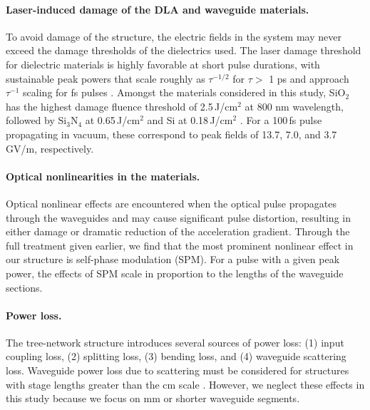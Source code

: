 \paragraph{Laser-induced damage of the DLA and waveguide materials.} To avoid damage of the structure, the electric fields in the system may never exceed the damage thresholds of the dielectrics used.  The laser damage threshold for dielectric materials is highly favorable at short pulse durations, with sustainable peak powers that scale roughly as $\tau^{-1/2}$ for $\tau >$ 1 ps and approach $\tau^{-1}$ scaling for fs pulses \cite{stuart1995laser, stuart1996nanosecond}.  Amongst the materials considered in this study, SiO$_2$ has the highest damage fluence threshold of 2.5\,J/cm$^{2}$ at 800 nm wavelength, followed by Si$_3$N$_4$ at 0.65\,J/cm$^{2}$ and Si at 0.18\,J/cm$^{2}$ \cite{soong2012laser}. For a 100\,fs pulse propagating in vacuum, these correspond to peak fields of 13.7, 7.0, and 3.7\,GV/m, respectively.

\paragraph{Optical nonlinearities in the materials.} Optical nonlinear effects are encountered when the optical pulse propagates through the waveguides and may cause significant pulse distortion, resulting in either damage or dramatic reduction of the acceleration gradient. Through the full treatment given earlier, we find that the most prominent nonlinear effect in our structure is self-phase modulation (SPM).  For a pulse with a given peak power, the effects of SPM scale in proportion to the lengths of the waveguide sections.
 
\paragraph{Power loss.}The tree-network structure introduces several sources of power loss: (1) input coupling loss, (2) splitting loss, (3) bending loss, and (4) waveguide scattering loss.  Waveguide power loss due to scattering must be considered for structures with stage lengths greater than the cm scale \cite{yamada2011silicon}.  However, we neglect these effects in this study because we focus on mm or shorter waveguide segments.

